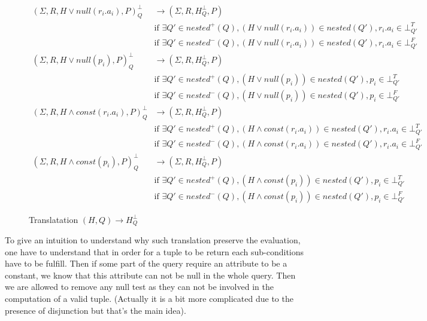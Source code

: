 \begin{figure}[H]
	\caption{\label{hq} Translatation $(H,Q) \rightarrow H^\bot _Q$ }
	\begin{mdframed}
		\fontsize{8}{6}
	\begin{align*}
		(\Sigma,R,H \lor null(r_i.a_i),P)^\bot_Q & \rightarrow (\Sigma,R,H^\bot_{Q},P) \\
		& \mbox{if } \exists Q' \in nested^+(Q), (H\lor null(r_i.a_i)) \in nested(Q'), r_i.a_i \in \bot^T_{Q'} \\
		& \mbox{if } \exists Q' \in nested^-(Q), (H\lor null(r_i.a_i)) \in nested(Q'), r_i.a_i \in \bot^F_{Q'} \\
		(\Sigma,R,H \lor null(p_i),P)^\bot_Q & \rightarrow (\Sigma,R,H^\bot_{Q},P) \\
		& \mbox{if } \exists Q' \in nested^+(Q), (H\lor null(p_i)) \in nested(Q'), p_i \in \bot^T_{Q'} \\
		& \mbox{if } \exists Q' \in nested^-(Q), (H\lor null(p_i)) \in nested(Q'), p_i \in \bot^F_{Q'} \\
		(\Sigma,R,H \land const(r_i.a_i),P)^\bot_Q & \rightarrow (\Sigma,R,H^\bot_{Q},P) \\
		& \mbox{if } \exists Q' \in nested^+(Q), (H\land const(r_i.a_i)) \in nested(Q'), r_i.a_i \in \bot^T_{Q'} \\
		& \mbox{if } \exists Q' \in nested^-(Q), (H\land const(r_i.a_i)) \in nested(Q'), r_i.a_i \in \bot^F_{Q'} \\
		(\Sigma,R,H \land const(p_i),P)^\bot_Q & \rightarrow (\Sigma,R,H^\bot_{Q},P) \\
		& \mbox{if } \exists Q' \in nested^+(Q), (H\land const(p_i)) \in nested(Q'), p_i \in \bot^T_{Q'} \\
		& \mbox{if } \exists Q' \in nested^-(Q), (H\land const(p_i)) \in nested(Q'), p_i \in \bot^F_{Q'} \
	\end{align*}
	\end{mdframed}
\end{figure}


To give an intuition to understand why such translation preserve the evaluation, one have to understand that in order for a tuple to be return each sub-conditions have to be fulfill. Then if some part of the query require an attribute to be a constant, we know that this attribute can not be null in the whole query. Then we are allowed to remove any null test as they can not be involved in the computation of a valid tuple.
(Actually it is a bit more complicated due to the presence of disjunction but that's the main idea).

